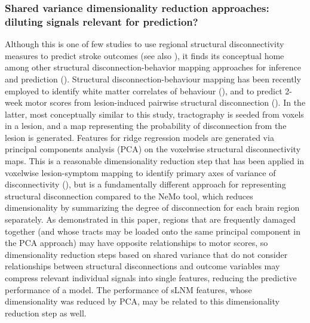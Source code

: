 \documentclass[10pt]{article}
\begin{document}
\subsubsection*{Shared variance dimensionality reduction approaches: diluting signals relevant for prediction?}
Although this is one of few studies to use regional structural disconnectivity measures to predict stroke outcomes (see also \cite{Tozlu2020-qa, Kuceyeski2016-vj}), it finds its conceptual home among other structural disconnection-behavior mapping approaches for inference and prediction (\cite{Salvalaggio2020-pe, Wawrzyniak2022-kl, Foulon2018-bj, Sperber2022-oj}). Structural disconnection-behaviour mapping has been recently employed to identify white matter correlates of behaviour (\cite{Wawrzyniak2022-kl, Foulon2018-bj}), and to predict 2-week motor scores from lesion-induced pairwise structural disconnection (\cite{Salvalaggio2020-pe}). In the latter, most conceptually similar to this study, tractography is seeded from voxels in a lesion, and a map representing the probability of disconnection from the lesion is generated. Features for ridge regression models are generated via principal components analysis (PCA) on the voxelwise structural disconnectivity maps. This is a reasonable dimensionality reduction step that has been applied in voxelwise lesion-symptom mapping to identify primary axes of variance of disconnectivity (\cite{Ivanova2021-nh}), but is a fundamentally different approach for representing structural disconnection compared to the NeMo tool, which reduces dimensionality by summarizing the degree of disconnection for each brain region separately. As demonstrated in this paper, regions that are frequently damaged together (and whose tracts may be loaded onto the same principal component in the PCA approach) may have opposite relationships to motor scores, so dimensionality reduction steps based on shared variance that do not consider relationships between structural disconnections and outcome variables may compress relevant individual signals into single features, reducing the predictive performance of a model. The performance of sLNM features, whose dimensionality was reduced by PCA, may be related to this dimensionality reduction step as well.
\end{document}
